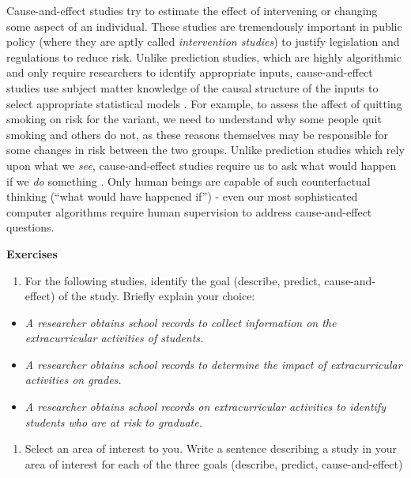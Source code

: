 \documentclass[]{book}
\providecommand{\tightlist}{%
  \setlength{\itemsep}{0pt}\setlength{\parskip}{0pt}}
\begin{document}
Cause-and-effect studies try to estimate the effect of intervening or changing some aspect of an individual. These studies are tremendously important in public policy (where they are aptly called \emph{intervention studies}) to justify legislation and regulations to reduce risk. Unlike prediction studies, which are highly algorithmic and only require researchers to identify appropriate inputs, cause-and-effect studies use subject matter knowledge of the causal structure of the inputs to select appropriate statistical models \citep{hernan2019second}. For example, to assess the affect of quitting smoking on risk for the variant, we need to understand why some people quit smoking and others do not, as these reasons themselves may be responsible for some changes in risk between the two groups. Unlike prediction studies which rely upon what we \emph{see}, cause-and-effect studies require us to ask what would happen if we \emph{do} something \citep{pearl2018book}. Only human beings are capable of such counterfactual thinking (``what would have happened if'') - even our most sophisticated computer algorithms require human supervision to address cause-and-effect questions.

\textbf{Exercises}

\begin{enumerate}
\def\labelenumi{\arabic{enumi}.}
\tightlist
\item
  For the following studies, identify the goal (describe, predict, cause-and-effect) of the study. Briefly explain your choice:
\end{enumerate}

\begin{itemize}
\item
  \emph{A researcher obtains school records to collect information on the extracurricular activities of students.}
\item
  \emph{A researcher obtains school records to determine the impact of extracurricular activities on grades.}
\item
  \emph{A researcher obtains school records on extracurricular activities to identify students who are at risk to graduate.}
\end{itemize}

\begin{enumerate}
\def\labelenumi{\arabic{enumi}.}
\setcounter{enumi}{1}
\tightlist
\item
  Select an area of interest to you. Write a sentence describing a study in your area of interest for each of the three goals (describe, predict, cause-and-effect)
\end{enumerate}
\end{document}
